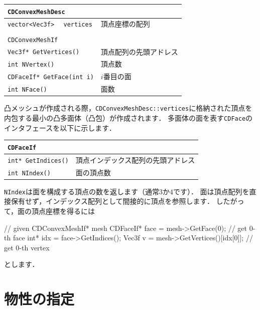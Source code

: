 \begin{center}
\begin{tabular}{lll}
\multicolumn{3}{l}{\texttt{CDConvexMeshDesc}}						\\ \midrule
\texttt{vector<Vec3f>}	&	\texttt{vertices}	& 頂点座標の配列	\\
\\
\multicolumn{3}{l}{\texttt{CDConvexMeshIf}}					\\ \midrule
\multicolumn{2}{l}{\texttt{Vec3f* GetVertices()}}			& 頂点配列の先頭アドレス	\\
\multicolumn{2}{l}{\texttt{int NVertex()}}					& 頂点数					\\
\multicolumn{2}{l}{\texttt{CDFaceIf* GetFace(int i)}}		& $i$番目の面				\\
\multicolumn{2}{l}{\texttt{int NFace()}}					& 面数						\\
\end{tabular}
\end{center}

\KLUDGE 凸メッシュが作成される際，\texttt{CDConvexMeshDesc::vertices}に格納された頂点を内包する最小の凸多面体（凸包）が作成されます．
\KLUDGE 多面体の面を表す\texttt{CDFace}のインタフェースを以下に示します．

\begin{center}
\begin{tabular}{lll}
\multicolumn{3}{l}{\texttt{CDFaceIf}}						\\ \midrule
\multicolumn{2}{l}{\texttt{int* GetIndices()}}				& 頂点インデックス配列の先頭アドレス	\\
\multicolumn{2}{l}{\texttt{int NIndex()}}					& 面の頂点数							\\
\end{tabular}
\end{center}

\texttt{NIndex}は面を構成する頂点の数を返します（通常$3$か$4$です）．
\KLUDGE 面は頂点配列を直接保有せず，インデックス配列として間接的に頂点を参照します．
\KLUDGE したがって，面の頂点座標を得るには
\begin{sourcecode}
// given CDConvexMeshIf* mesh
CDFaceIf* face = mesh->GetFace(0);        // get 0-th face
int* idx = face->GetIndices();
Vec3f v = mesh->GetVertices()[idx[0]];    // get 0-th vertex
\end{sourcecode}
\KLUDGE とします．

\section{物性の指定}
\label{sec_collision_material}

